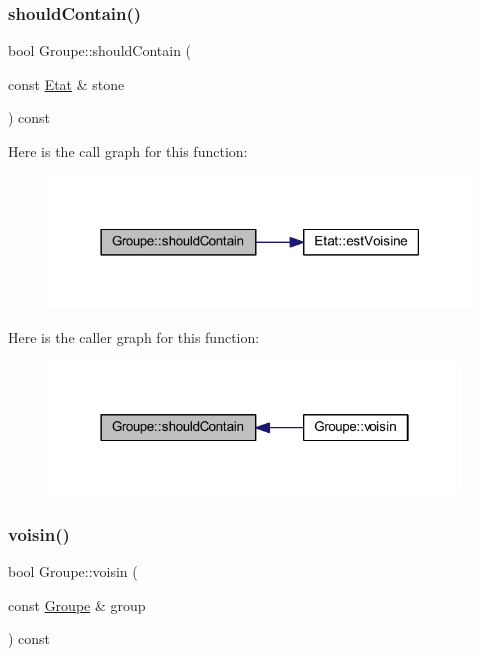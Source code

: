 \subsubsection{\texorpdfstring{should\+Contain()}{shouldContain()}}
{\footnotesize\ttfamily bool Groupe\+::should\+Contain (\begin{DoxyParamCaption}\item[{const \hyperlink{class_etat}{Etat} \&}]{stone }\end{DoxyParamCaption}) const}

Here is the call graph for this function\+:
\nopagebreak
\begin{figure}[H]
\begin{center}
\leavevmode
\includegraphics[width=318pt]{class_groupe_a51ae2500f67ac071215ba3ff49e91b17_cgraph}
\end{center}
\end{figure}
Here is the caller graph for this function\+:
\nopagebreak
\begin{figure}[H]
\begin{center}
\leavevmode
\includegraphics[width=310pt]{class_groupe_a51ae2500f67ac071215ba3ff49e91b17_icgraph}
\end{center}
\end{figure}
\mbox{\label{class_groupe_a13537bf2de72a097dd9ee102d14686d5}} 
\subsubsection{\texorpdfstring{voisin()}{voisin()}}
{\footnotesize\ttfamily bool Groupe\+::voisin (\begin{DoxyParamCaption}\item[{const \hyperlink{class_groupe}{Groupe} \&}]{group }\end{DoxyParamCaption}) const}

